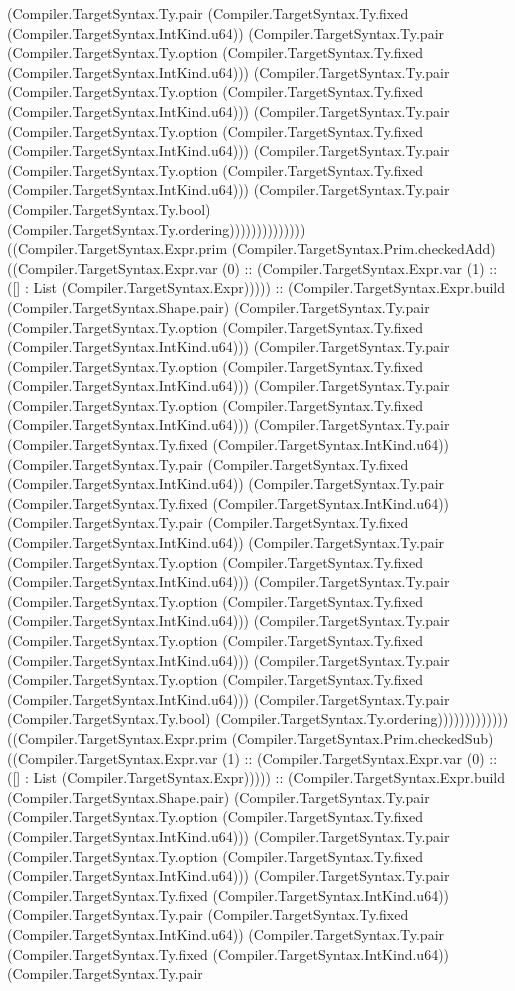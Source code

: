 \documentclass[11pt]{article}
\begin{document}
(Compiler.TargetSyntax.Ty.pair (Compiler.TargetSyntax.Ty.fixed (Compiler.TargetSyntax.IntKind.u64)) (Compiler.TargetSyntax.Ty.pair (Compiler.TargetSyntax.Ty.option (Compiler.TargetSyntax.Ty.fixed (Compiler.TargetSyntax.IntKind.u64))) (Compiler.TargetSyntax.Ty.pair (Compiler.TargetSyntax.Ty.option (Compiler.TargetSyntax.Ty.fixed (Compiler.TargetSyntax.IntKind.u64))) (Compiler.TargetSyntax.Ty.pair (Compiler.TargetSyntax.Ty.option (Compiler.TargetSyntax.Ty.fixed (Compiler.TargetSyntax.IntKind.u64))) (Compiler.TargetSyntax.Ty.pair (Compiler.TargetSyntax.Ty.option (Compiler.TargetSyntax.Ty.fixed (Compiler.TargetSyntax.IntKind.u64))) (Compiler.TargetSyntax.Ty.pair (Compiler.TargetSyntax.Ty.bool) (Compiler.TargetSyntax.Ty.ordering)))))))))))))) ((Compiler.TargetSyntax.Expr.prim (Compiler.TargetSyntax.Prim.checkedAdd) ((Compiler.TargetSyntax.Expr.var (0) :: (Compiler.TargetSyntax.Expr.var (1) :: ([] : List (Compiler.TargetSyntax.Expr))))) :: (Compiler.TargetSyntax.Expr.build (Compiler.TargetSyntax.Shape.pair) (Compiler.TargetSyntax.Ty.pair (Compiler.TargetSyntax.Ty.option (Compiler.TargetSyntax.Ty.fixed (Compiler.TargetSyntax.IntKind.u64))) (Compiler.TargetSyntax.Ty.pair (Compiler.TargetSyntax.Ty.option (Compiler.TargetSyntax.Ty.fixed (Compiler.TargetSyntax.IntKind.u64))) (Compiler.TargetSyntax.Ty.pair (Compiler.TargetSyntax.Ty.option (Compiler.TargetSyntax.Ty.fixed (Compiler.TargetSyntax.IntKind.u64))) (Compiler.TargetSyntax.Ty.pair (Compiler.TargetSyntax.Ty.fixed (Compiler.TargetSyntax.IntKind.u64)) (Compiler.TargetSyntax.Ty.pair (Compiler.TargetSyntax.Ty.fixed (Compiler.TargetSyntax.IntKind.u64)) (Compiler.TargetSyntax.Ty.pair (Compiler.TargetSyntax.Ty.fixed (Compiler.TargetSyntax.IntKind.u64)) (Compiler.TargetSyntax.Ty.pair (Compiler.TargetSyntax.Ty.fixed (Compiler.TargetSyntax.IntKind.u64)) (Compiler.TargetSyntax.Ty.pair (Compiler.TargetSyntax.Ty.option (Compiler.TargetSyntax.Ty.fixed (Compiler.TargetSyntax.IntKind.u64))) (Compiler.TargetSyntax.Ty.pair (Compiler.TargetSyntax.Ty.option (Compiler.TargetSyntax.Ty.fixed (Compiler.TargetSyntax.IntKind.u64))) (Compiler.TargetSyntax.Ty.pair (Compiler.TargetSyntax.Ty.option (Compiler.TargetSyntax.Ty.fixed (Compiler.TargetSyntax.IntKind.u64))) (Compiler.TargetSyntax.Ty.pair (Compiler.TargetSyntax.Ty.option (Compiler.TargetSyntax.Ty.fixed (Compiler.TargetSyntax.IntKind.u64))) (Compiler.TargetSyntax.Ty.pair (Compiler.TargetSyntax.Ty.bool) (Compiler.TargetSyntax.Ty.ordering))))))))))))) ((Compiler.TargetSyntax.Expr.prim (Compiler.TargetSyntax.Prim.checkedSub) ((Compiler.TargetSyntax.Expr.var (1) :: (Compiler.TargetSyntax.Expr.var (0) :: ([] : List (Compiler.TargetSyntax.Expr))))) :: (Compiler.TargetSyntax.Expr.build (Compiler.TargetSyntax.Shape.pair) (Compiler.TargetSyntax.Ty.pair (Compiler.TargetSyntax.Ty.option (Compiler.TargetSyntax.Ty.fixed (Compiler.TargetSyntax.IntKind.u64))) (Compiler.TargetSyntax.Ty.pair (Compiler.TargetSyntax.Ty.option (Compiler.TargetSyntax.Ty.fixed (Compiler.TargetSyntax.IntKind.u64))) (Compiler.TargetSyntax.Ty.pair (Compiler.TargetSyntax.Ty.fixed (Compiler.TargetSyntax.IntKind.u64)) (Compiler.TargetSyntax.Ty.pair (Compiler.TargetSyntax.Ty.fixed (Compiler.TargetSyntax.IntKind.u64)) (Compiler.TargetSyntax.Ty.pair (Compiler.TargetSyntax.Ty.fixed (Compiler.TargetSyntax.IntKind.u64)) (Compiler.TargetSyntax.Ty.pair 
\end{document}
